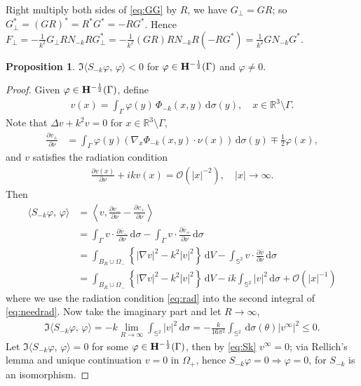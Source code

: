 \documentclass[a4paper,12pt]{article}
\theoremstyle{definition}
\newtheorem{prp}{Proposition}
\newcommand\bdr{\Gamma}
\newcommand\Hhm{{\bf H}^{-\frac{1}{2}}}
\newcommand\Hhmg{\Hhm(\bdr)}
\newcommand\ints[2][y]{\int_{\bdr}#2\,\text{d}\sigma(#1)}
\newcommand\intsn[1]{\int_{\bdr}#1\,\text{d}\sigma}
\newcommand\intbn[1]{\int_{\mathbb{S}^2}#1\,\text{d}\sigma}
\newcommand\intc[2][(\theta)]{\int_{\mathbb{S}^2}#2\,\text{d}\sigma#1}
\begin{document}
Right multiply both sides of \eqref{eq:GG} by $R$, we have $G_\perp = GR$; so $G_\perp^* = (GR)^* = R^* G^* = -RG^*$. Hence $F_\perp = -\frac{1}{k^2}G_\perp R N_{-k} R G_\perp^* = -\frac{1}{k^2}(GR) R N_{-k} R (-RG^*) = \frac{1}{k^2}G N_{-k} G^*$.


\begin{prp}\label{prp:ImS}
  $\Im\langle S_{-k}\varphi,\,\varphi\rangle < 0$ for $\varphi\in\Hhmg$ and $\varphi\not=0$.
\end{prp}

\begin{proof}
  Given $\varphi\in\Hhmg$, define 
  \begin{align}\label{eq:v}
    v(x) = \ints{\varphi(y)\,\Phi_{-k}(x,y)},\quad x\in\mathbb{R}^3\setminus\bdr.
  \end{align}
  Note that $\Delta v + k^2 v=0$ for $x\in\mathbb{R}^3\setminus\bdr$,
  \begin{align*}
    \frac{\partial v_\pm}{\partial\nu} &= \ints{\varphi(y)\left(\nabla_x\Phi_{-k}(x, y)\cdot\nu(x)\right)}\mp\frac{1}{2}\varphi(x), 
  \end{align*}
  and $v$ satisfies the radiation condition
  \begin{align}\label{eq:rad}
    \frac{\partial v(x)}{\partial\nu} + i k v(x) = \mathcal{O}\left(|x|^{-2}\right),\quad|x|\to\infty. 
  \end{align}
  Then
  \begin{align}
    \langle S_{-k}\varphi,\,\varphi\rangle &=\left\langle v, \frac{\partial v_-}{\partial\nu} -\frac{\partial v_+}{\partial\nu}\right\rangle\nonumber\\
    &=\intsn{v\cdot\frac{\partial\overline{v}_-}{\partial\nu}} - \intsn{v\cdot\frac{\partial\overline{v}_+}{\partial\nu}}\nonumber\\
    &=\int_{B_R\cup\Omega_-}\left\{|\nabla v|^2 - k^2|v|^2\right\}\,\text{d}V - \intbn{v\cdot\frac{\partial\overline{v}}{\partial\nu}}\label{eq:needrad}\\
    &=\int_{B_R\cup\Omega_-}\left\{|\nabla v|^2 - k^2|v|^2\right\}\,\text{d}V - ik\intbn{|v|^2} + \mathcal{O}\left(|x|^{-1}\right)\label{eq:Sk}
  \end{align}
  where we use the radiation condition \eqref{eq:rad} into the second integral of \eqref{eq:needrad}. Now take the imaginary part and let $R\to\infty$, 
  \begin{align*}
    \Im\langle S_{-k}\varphi,\,\varphi\rangle = -k\lim_{R\to\infty}\intbn{|v|^2} = -\frac{k}{16\pi^2}\intc{}{|v^\infty|^2}\leqslant 0.
  \end{align*}
  Let $\Im\langle S_{-k}\varphi,\,\varphi\rangle = 0$ for some $\varphi\in\Hhmg$, then by \eqref{eq:Sk} $v^\infty=0$; via Rellich's lemma and unique continuation $v=0$ in $\Omega_+$, hence $S_{-k}\varphi=0\Longrightarrow\varphi = 0$, for $S_{-k}$ is an isomorphism.    
\end{proof}
\end{document}
